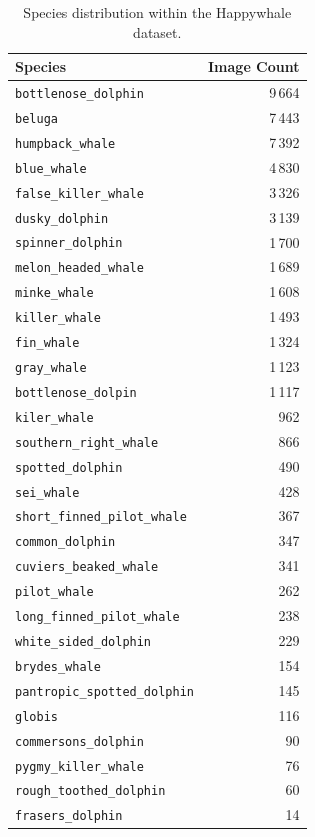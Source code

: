 \documentclass[twocolumn]{article}
\begin{document}
\begin{table}[ht]
\centering
\begin{tabular}{l r}
\hline
\textbf{Species} & \textbf{Image Count} \\
\hline
\texttt{bottlenose\_dolphin}           & 9\,664 \\
\texttt{beluga}                        & 7\,443 \\
\texttt{humpback\_whale}               & 7\,392 \\
\texttt{blue\_whale}                   & 4\,830 \\
\texttt{false\_killer\_whale}          & 3\,326 \\
\texttt{dusky\_dolphin}                & 3\,139 \\
\texttt{spinner\_dolphin}              & 1\,700 \\
\texttt{melon\_headed\_whale}          & 1\,689 \\
\texttt{minke\_whale}                  & 1\,608 \\
\texttt{killer\_whale}                 & 1\,493 \\
\texttt{fin\_whale}                    & 1\,324 \\
\texttt{gray\_whale}                   & 1\,123 \\
\texttt{bottlenose\_dolpin}            & 1\,117 \\
\texttt{kiler\_whale}                  &   962 \\
\texttt{southern\_right\_whale}        &   866 \\
\texttt{spotted\_dolphin}              &   490 \\
\texttt{sei\_whale}                    &   428 \\
\texttt{short\_finned\_pilot\_whale}   &   367 \\
\texttt{common\_dolphin}               &   347 \\
\texttt{cuviers\_beaked\_whale}        &   341 \\
\texttt{pilot\_whale}                  &   262 \\
\texttt{long\_finned\_pilot\_whale}    &   238 \\
\texttt{white\_sided\_dolphin}         &   229 \\
\texttt{brydes\_whale}                 &   154 \\
\texttt{pantropic\_spotted\_dolphin}   &   145 \\
\texttt{globis}                        &   116 \\
\texttt{commersons\_dolphin}           &    90 \\
\texttt{pygmy\_killer\_whale}          &    76 \\
\texttt{rough\_toothed\_dolphin}       &    60 \\
\texttt{frasers\_dolphin}&    14 \\
\hline
\end{tabular}
\caption{Species distribution within the Happywhale dataset.}
\label{tab:species_counts}
\end{table}
\end{document}
